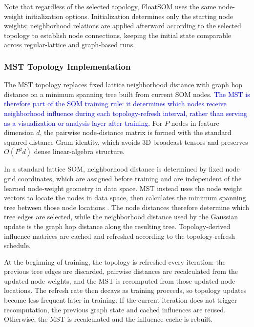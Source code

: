 \documentclass[10pt]{article} %
\newcommand{\TrackedChange}[1]{\textcolor{blue}{#1}}
\begin{document}
Note that regardless of the selected topology, FloatSOM uses the same node-weight initialization options. Initialization determines only the starting node weights; neighborhood relations are applied afterward according to the selected topology to establish node connections, keeping the initial state comparable across regular-lattice and graph-based runs.

\subsubsection{MST Topology Implementation}

The MST topology replaces fixed lattice neighborhood distance with graph hop distance on a minimum spanning tree built from current SOM nodes. \TrackedChange{The MST is therefore part of the SOM training rule: it determines which nodes receive neighborhood influence during each topology-refresh interval, rather than serving as a visualization or analysis layer after training.} For $P$ nodes in feature dimension $d$, the pairwise node-distance matrix is formed with the standard squared-distance Gram identity, which avoids 3D broadcast tensors and preserves $O(P^2 d)$ dense linear-algebra structure.

In a standard lattice SOM, neighborhood distance is determined by fixed node grid coordinates, which are assigned before training and are independent of the learned node-weight geometry in data space. MST instead uses the node weight vectors to locate the nodes in data space, then calculates the minimum spanning tree between those node locations \citep{kruskalShortestSpanningSubtree1956}. The node distances therefore determine which tree edges are selected, while the neighborhood distance used by the Gaussian update is the graph hop distance along the resulting tree. Topology-derived influence matrices are cached and refreshed according to the topology-refresh schedule.

At the beginning of training, the topology is refreshed every iteration: the previous tree edges are discarded, pairwise distances are recalculated from the updated node weights, and the MST is recomputed from those updated node locations. The refresh rate then decays as training proceeds, so topology updates become less frequent later in training. If the current iteration does not trigger recomputation, the previous graph state and cached influences are reused. Otherwise, the MST is recalculated and the influence cache is rebuilt.
\end{document}
